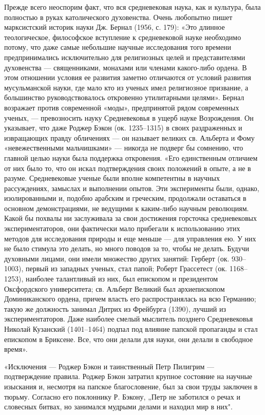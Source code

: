 Прежде всего неоспорим факт, что вся средневековая наука, как и культура,
была полностью в руках католического духовенства. Очень любопытно пишет
марксистский историк науки Дж. Бернал (1956, с. 179): «Это длинное
теологическое, философское вступление к средневековой науке необходимо
потому, что даже самые небольшие научные исследования того времени
предпринимались исключительно для религиозных целей и представителями
духовенства --- священниками, монахами или членами какого-либо ордена. В этом
отношении условия ее развития заметно отличаются от условий развития
мусульманской науки, где мало кто из ученых имел религиозное призвание, а
большинство руководствовалось откровенно утилитарными целями». Бернал
возражает против современной «моды», предпринятой рядом современных ученых, ---
превозносить науку Средневековья в ущерб науке Возрождения. Он указывает, что
даже Роджер Бэкон (ок. 1235--1315) в своих раздраженных и извращающих
правду обличениях --- он называет великих св. Альберта и Фому
«невежественными мальчишками» --- никогда не подверг бы сомнению, что главной
целью науки была поддержка откровения. «Его единственным отличием от них
было то, что он искал подтверждения своих положений в опыте, а не в разуме.
Средневековые ученые были вполне компетентны в научных рассуждениях,
замыслах и выполнении опытов. Эти эксперименты были, однако, изолированными и,
подобно арабским и греческим, продолжали оставаться в основном
демонстрациями, не ведущими к каким-либо научным революциям. Какой бы
похвалы ни заслуживала за свои достижения горсточка средневековых
экспериментаторов, они фактически мало прибегали к использованию этих
методов для исследования природы и еще меньше --- для управления ею. У них не
было стимула это делать, но много поводов за то, чтобы не делать. Будучи
духовными лицами, они имели множество других занятий: Герберт (ок.
930--1003), первый из западных ученых, стал папой; Роберт Грассетест (ок.
1168--1253), наиболее талантливый из них, был епископом и президентом
Оксфордского университета; св. Альберт Великий был архиепископом
Доминиканского ордена, причем власть его распространялась на всю Германию;
такую же должность занимал Дитрих из Фрейбурга (1390), лучший из
экспериментаторов. Даже наиболее смелый мыслитель позднего Средневековья
Николай Кузанский (1401--1464) подпал под влияние папской пропаганды и стал
епископом в Бриксене. Все, что они делали для науки, они делали в свободное
время».

«Исключения --- Роджер Бэкон и таинственный Петр Пилигрим --- подтверждение
правила. Роджер Бэкон затратил крупное состояние на научные изыскания и,
несмотря на папское благословение, был за свои труды заключен в тюрьму.
Согласно его поклоннику Р. Бэкону, „Петр не заботился о речах и словесных
битвах, но занимался мудрыми делами и находил мир в них".

